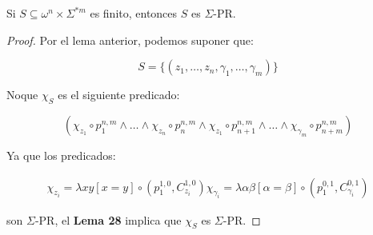   \begin{corollary}
    \par Si $S \subseteq \omega^{n} \times \Sigma^{\ast m}$ es finito, entonces $S$ es $\Sigma$-PR.
  \end{corollary}
  \begin{proof}
    \par Por el lema anterior, podemos suponer que:

    \[
      S = \{ (z_{1}, \dotsc, z_{n}, \gamma_{1}, \dotsc, \gamma_{m}) \}
    \]

    \par Noque $\chi_{S}$ es el siguiente predicado:

    \[
      \left( \chi_{z_{1}} \circ p_{1}^{n, m} \wedge \dotsc \wedge \chi_{z_{n}} \circ p_{n}^{n, m} \wedge
      \chi_{z_{1}} \circ p_{n+1}^{n, m} \wedge \dotsc \wedge \chi_{\gamma_{m}} \circ p_{n+m}^{n, m} \right)
    \]

    \par Ya que los predicados:

    \begin{eqnarray}
      \nonumber \chi_{z_{i}} = \lambda xy \left[x = y\right] \circ \left(p_{1}^{1, 0}, C_{z_{i}}^{1, 0} \right)
      \nonumber \chi_{\gamma_{i}} = \lambda \alpha \beta \left[\alpha = \beta\right] \circ \left(p_{1}^{0, 1},
      C_{\gamma_{i}}^{0, 1} \right)
    \end{eqnarray}

    \par son $\Sigma$-PR, el \textbf{Lema 28} implica que $\chi_{S}$ es $\Sigma$-PR.
  \end{proof}

